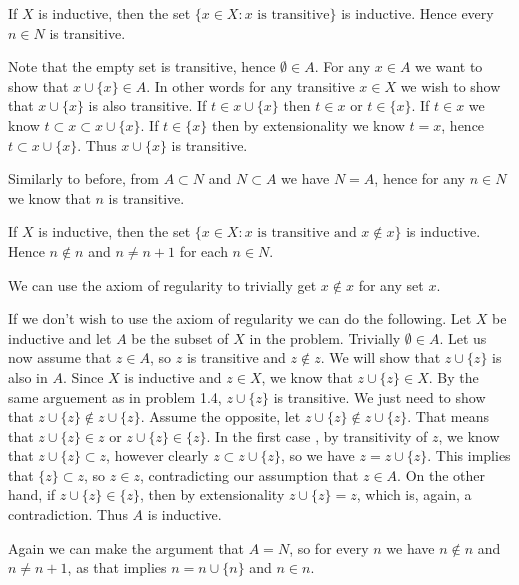 \begin{problem}
  If $X$ is inductive, then the set $\{x \in X : x \text{ is transitive}\}$ is inductive.
  Hence every $n \in N$ is transitive.
\end{problem}

\begin{solution}
  Note that the empty set is transitive, hence $\emptyset \in A$.
  For any $x \in A$ we want to show that $x \cup \{x\} \in A$.
  In other words for any transitive $x \in X$ we wish to show that $x \cup \{x\}$ is also transitive.
  If $t \in x \cup \{x\}$ then $t \in x$ or $t \in \{x\}$.
  If $t \in x$ we know $t \subset x \subset x \cup \{x\}$.
  If $t \in \{x\}$ then by extensionality we know $t = x$, hence $t \subset x \cup \{x\}$.
  Thus $x \cup \{x\}$ is transitive.

  Similarly to before, from $A \subset N$ and $N \subset A$ we have $N = A$, hence for any $n \in N$ we know that $n$ is transitive.
\end{solution}

\begin{problem}
  If $X$ is inductive, then the set $\{x \in X : x \text{ is transitive and } x \notin x\}$ is inductive.
  Hence $n \notin n$ and $n \neq n + 1$ for each $n \in N$.
\end{problem}

\begin{solution}
  We can use the axiom of regularity to trivially get $x \notin x$ for any set $x$.

  If we don't wish to use the axiom of regularity we can do the following.
  Let $X$ be inductive and let $A$ be the subset of $X$ in the problem.
  Trivially $\emptyset \in A$.
  Let us now assume that $z \in A$, so $z$ is transitive and $z \notin z$.
  We will show that $z \cup \{z\}$ is also in $A$.
  Since $X$ is inductive and $z \in X$, we know that $z \cup \{z\} \in X$.
  By the same arguement as in problem 1.4, $z \cup \{z\}$ is transitive.
  We just need to show that $z \cup \{z\} \notin z \cup \{z\}$.
  Assume the opposite, let $z \cup \{z\} \notin z \cup \{z\}$.
  That means that $z \cup \{z\} \in z$ or $z \cup \{z\} \in \{z\}$.
  In the first case , by transitivity of $z$, we know that $z \cup \{z\} \subset z$, however clearly $z \subset z \cup \{z\}$, so we have $z = z \cup \{z\}$.
  This implies that $\{z\} \subset z$, so $z \in z$, contradicting our assumption that $z \in A$.
  On the other hand, if $z \cup \{z\} \in \{z\}$, then by extensionality $z \cup \{z\} = z$, which is, again, a contradiction.
  Thus $A$ is inductive.

  Again we can make the argument that $A = N$, so for every $n$ we have $n \notin n$ and $n \neq n + 1$, as that implies $n = n \cup \{n\}$ and $n \in n$.
\end{solution}

